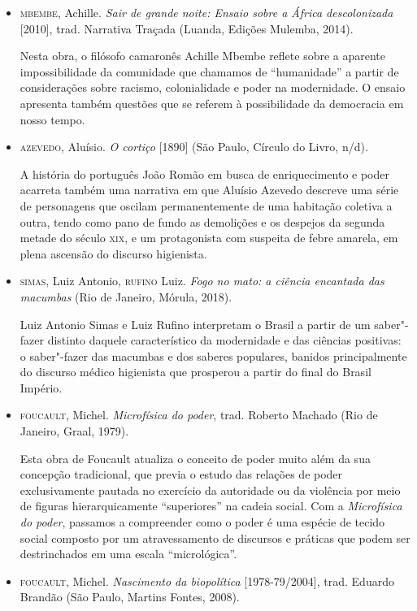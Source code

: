 \documentclass[12pt]{extarticle}
\begin{document}
\begin{itemize}
\item \textsc{mbembe}, Achille. \emph{Sair de grande noite: Ensaio sobre a África
descolonizada} {[}2010{]}, trad. Narrativa Traçada (Luanda, Edições
Mulemba, 2014).

Nesta obra, o filósofo camaronês Achille Mbembe
reflete sobre a aparente impossibilidade da comunidade que chamamos de
``humanidade'' a partir de considerações sobre racismo, colonialidade e
poder na modernidade. O ensaio apresenta também questões que se referem
à possibilidade da democracia em nosso tempo.


\item \textsc{azevedo}, Aluísio. \emph{O cortiço} {[}1890{]} (São Paulo, Círculo do
Livro, n/d). 

A história do português João Romão em busca de
enriquecimento e poder acarreta também uma narrativa em que Aluísio
Azevedo descreve uma série de personagens que oscilam permanentemente de
uma habitação coletiva a outra, tendo como pano de fundo as demolições e
os despejos da segunda metade do século \textsc{xix}, e um protagonista com
suspeita de febre amarela, em plena ascensão do discurso higienista.

\item \textsc{simas}, Luiz Antonio, \textsc{rufino} Luiz. \emph{Fogo no mato: a ciência
encantada das macumbas} (Rio de Janeiro, Mórula, 2018). 

Luiz Antonio
Simas e Luiz Rufino interpretam o Brasil a partir de um saber"-fazer
distinto daquele característico da modernidade e das ciências positivas:
o saber"-fazer das macumbas e dos saberes populares, banidos
principalmente do discurso médico higienista que prosperou a partir do
final do Brasil Império.

\item \textsc{foucault}, Michel. \emph{Microfísica do poder}, trad. Roberto Machado (Rio
de Janeiro, Graal, 1979). 

Esta obra de Foucault atualiza o conceito
de poder muito além da sua concepção tradicional, que previa o estudo
das relações de poder exclusivamente pautada no exercício da autoridade
ou da violência por meio de figuras hierarquicamente ``superiores'' na
cadeia social. Com a \emph{Microfísica do poder}, passamos a compreender
como o poder é uma espécie de tecido social composto por um
atravessamento de discursos e práticas que podem ser destrinchados em
uma escala ``micrológica''.

\item \textsc{foucault}, Michel. \emph{Nascimento da biopolítica} {[}1978-79/2004{]},
trad. Eduardo Brandão (São Paulo, Martins Fontes, 2008). 


\end{itemize}
\end{document}

